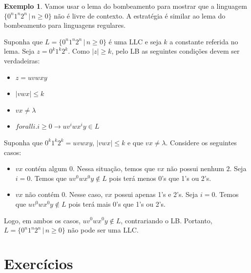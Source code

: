 \documentclass[a4paper]{article}
\theoremstyle{definition}
\newtheorem{Example}{Exemplo}
\begin{document}
  \begin{Example}
    Vamos usar o lema do bombeamento para mostrar que a linguagem
    $\{0^n1^n2^n\,|\,n\geq 0\}$ não é livre de contexto. A estratégia é similar
    ao lema do bombeamento para linguagens regulares.

    Suponha que $L = \{0^n1^n2^n\,|\,n\geq 0\}$ é uma LLC e seja $k$ a
    constante referida no lema. Seja $z = 0^k1^k2^k$. Como $|z|\geq k$, pelo LB
    as seguintes condições devem ser verdadeiras:
    \begin{itemize}
      \item $z = uvwxy$
      \item $|vwx| \leq k$
      \item $vx \neq \lambda$
      \item $forall i. i \geq 0 \to uv^iwx^iy \in L$
    \end{itemize}
    Suponha que $0^k1^k2^k = uvwxy$, $|vwx| \leq k$ e que $vx \neq \lambda$.
    Considere os seguintes casos:
    \begin{itemize}
      \item $vx$ contém algum $0$. Nessa situação, temos que $vx$ não possui
        nenhum $2$. Seja $ i= 0$. Temos que $uv^0wx^0y \not\in L$ pois terá
        menos 0's que 1's ou 2's.
      \item $vx$ não contém $0$. Nesse caso, $vx$ possui apenas 1's e 2's. Seja
        $i = 0$. Temos que $uv^0wx^0y \not\in L$ pois terá
        mais 0's que 1's ou 2's.
      \end{itemize}
      Logo, em ambos os casos, $uv^0wx^0y \not\in L$, contrariando o LB.
      Portanto, $L = \{0^n1^n2^n\,|\,n\geq 0\}$ não pode ser uma LLC.
  \end{Example}
  
  \section{Exercícios} 
\end{document}
